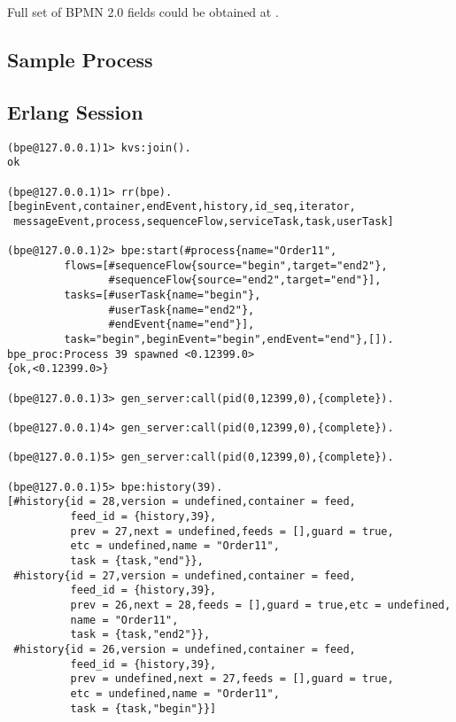 Full set of BPMN 2.0 fields could be obtained at .

\newpage

\subsection{Sample Process}

\subsection{Erlang Session}

\vspace{1\baselineskip}
\begin{lstlisting}
(bpe@127.0.0.1)1> kvs:join().
ok

(bpe@127.0.0.1)1> rr(bpe).
[beginEvent,container,endEvent,history,id_seq,iterator,
 messageEvent,process,sequenceFlow,serviceTask,task,userTask]

(bpe@127.0.0.1)2> bpe:start(#process{name="Order11",
         flows=[#sequenceFlow{source="begin",target="end2"},
                #sequenceFlow{source="end2",target="end"}],
         tasks=[#userTask{name="begin"},
                #userTask{name="end2"},
                #endEvent{name="end"}],
         task="begin",beginEvent="begin",endEvent="end"},[]).
bpe_proc:Process 39 spawned <0.12399.0>
{ok,<0.12399.0>}

(bpe@127.0.0.1)3> gen_server:call(pid(0,12399,0),{complete}).

(bpe@127.0.0.1)4> gen_server:call(pid(0,12399,0),{complete}).

(bpe@127.0.0.1)5> gen_server:call(pid(0,12399,0),{complete}).

(bpe@127.0.0.1)5> bpe:history(39).
[#history{id = 28,version = undefined,container = feed,
          feed_id = {history,39},
          prev = 27,next = undefined,feeds = [],guard = true,
          etc = undefined,name = "Order11",
          task = {task,"end"}},
 #history{id = 27,version = undefined,container = feed,
          feed_id = {history,39},
          prev = 26,next = 28,feeds = [],guard = true,etc = undefined,
          name = "Order11",
          task = {task,"end2"}},
 #history{id = 26,version = undefined,container = feed,
          feed_id = {history,39},
          prev = undefined,next = 27,feeds = [],guard = true,
          etc = undefined,name = "Order11",
          task = {task,"begin"}}]
\end{lstlisting}


